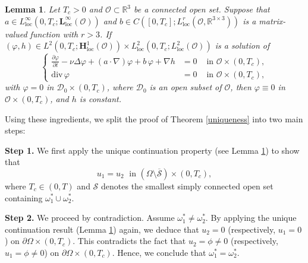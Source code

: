 \documentclass[a4paper,12pt,reqno,natbib]{amsart}
\newtheorem{lemma}[theorem]{Lemma}
\def\O{\mathcal O}
\def\L{\textbf{L}}
\begin{document}
\begin{lemma}\label{u-c-l}
Let \( T_c > 0 \) and \( \O \subset \mathbb{R}^3 \) be a connected open set. Suppose that \( a \in L_{\text{loc}}^{\infty}(0,T_c;\L_{\text{loc}}^{\infty}(\O)) \) and \( b \in C\left([0, T_c] ; L_{\text{loc}}^r\left(\O, \mathbb{R}^{3 \times 3}\right)\right) \) is a matrix-valued function with \( r > 3 \). If \( (\varphi, h) \in L^2\left(0, T_c; \mathbf{H}_{\text{loc}}^1(\O)\right) \times L_{\text{loc}}^2(0,T_c;L_{\text{loc}}^2(\O)) \) is a solution of  
\begin{equation*}  
\left\{  
\begin{array}{rll}  
\displaystyle \frac {\partial \varphi}{\partial t} - \nu \Delta \varphi + (a \cdot \nabla) \varphi + b \,\varphi + \nabla h &= 0 &\text{ in } \O \times (0, T_c), \\  
\text{div}\, \varphi &= 0 &\text{ in } \O \times (0, T_c),  
\end{array}  
\right.  
\end{equation*}  
with \( \varphi = 0 \) in \( \mathcal{D}_0 \times (0, T_c) \), where \( \mathcal{D}_0 \) is an open subset of \( \O \), then \( \varphi \equiv 0 \) in \( \O \times (0, T_c) \), and \( h \) is constant.  
\end{lemma}




Using these ingredients, we split the proof of Theorem \ref{uniqueness} into two main steps:

\medskip

\noindent
\textbf{Step 1.}  
We first apply the unique continuation property (see Lemma \ref{u-c-l}) to show that
\[
u_1 = u_2 \; \text{ in } (\Omega \setminus \overline{\mathcal{S}}) \times (0, T_c),
\]
where $T_c\in(0,T)$ and \( \mathcal{S} \) denotes the smallest simply connected open set containing \( \omega_1^* \cup \omega_2^* \).

\medskip

\noindent
\textbf{Step 2.}  
We proceed by contradiction.  
Assume \( \omega_1^* \neq \omega_2^* \).  
By applying the unique continuation result (Lemma \ref{u-c-l}) again, we deduce that \( u_2 = 0 \) (respectively, \( u_1 = 0 \)) on \( \partial \Omega \times (0, T_c) \).  
This contradicts the fact that \( u_2 = \phi \neq 0 \) (respectively, \( u_1 = \phi \neq 0 \)) on \( \partial \Omega \times (0, T_c) \).  
Hence, we conclude that \( \omega_1^* = \omega_2^* \).\\
\end{document}
